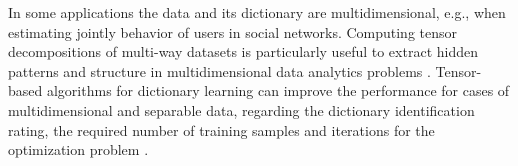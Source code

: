 
In some applications the data and its dictionary are multidimensional, e.g., when estimating jointly behavior of users in social networks. Computing tensor decompositions of multi-way datasets is particularly useful to extract hidden patterns and structure in multidimensional data analytics problems \cite{kolda2009tensor}. Tensor-based algorithms for dictionary learning can improve the performance for cases of multidimensional and separable data, regarding the dictionary identification rating, the required number of training samples and iterations for the optimization problem \cite{roemer2014tensor}.


